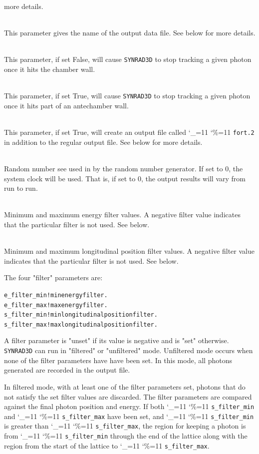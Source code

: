 \documentclass[11pt]{article}
\newcommand{\srthree}{\texttt{SYNRAD3D}\xspace}
\newcommand\ttcmd{\begingroup\catcode`\_=11 \catcode`\%=11 \dottcmd}
\newcommand\dottcmd[1]{\texttt{#1}\endgroup}
\newcommand{\vn}{\ttcmd}
\newcommand{\Newline}{\hfil \\}
\newlength{\ExBeg}
\newlength{\ExEnd}
\newenvironment{example}
  {\vspace{\ExBeg} \begin{alltt}}
  {\end{alltt} \vspace{\ExEnd}}
\begin{document}
\begin{description}
more details.
  \item[\vn{dat_file}] \Newline
This parameter gives the name of the output data file.
See below for more details.
  \item[\vn{sr3d_params\%allow_reflections}] \Newline
This parameter, if set False, will cause \srthree to stop tracking a given photon once
it hits the chamber wall.
  \item[\vn{sr3d_params\%stop_if_hit_antechamber}] \Newline
This parameter, if set True, will cause \srthree to stop tracking a given photon once
it hits part of an antechamber wall.
  \item[\vn{sr3d_params\%debug}] \Newline
This parameter, if set True, will create an output file called \vn{fort.2} in addition
to the regular output file.
See below for more details.
  \item[\vn{random_seed}] \Newline
Random number see used in by the random number generator. If set to 0, the system clock
will be used. That is, if set to 0, the output results will vary from run to run. 
  \item[\vn{e_filter_min}, \vn{e_filter_max}] \Newline
Minimum and maximum energy filter values. A negative filter value
indicates that the particular filter is not used. See below.
  \item[\vn{s_filter_min}, \vn{s_filter_max}] \Newline
Minimum and maximum longitudinal position filter values. A negative filter value
indicates that the particular filter is not used. See below.
\end{description}

The four "filter" parameters are:
\begin{example}
  e_filter_min   ! min energy filter.
  e_filter_max   ! max energy filter.
  s_filter_min   ! min longitudinal position filter.
  s_filter_max   ! max longitudinal position filter.
\end{example}
A filter parameter is "unset" if its value is negative and is "set"
otherwise.  \srthree can run in "filtered" or "unfiltered"
mode. Unfiltered mode occurs when none of the filter parameters have
have been set. In this mode, all photons generated are recorded in
the output file.

In filtered mode, with at least one of the filter parameters set,
photons that do not satisfy the set filter values are discarded. The
filter parameters are compared against the final photon position and
energy. If both \vn{s_filter_min} and \vn{s_filter_max} have been set,
and \vn{s_filter_min} is greater than \vn{s_filter_max}, the region
for keeping a photon is from \vn{s_filter_min} through the end of the
lattice along with the region from the start of the lattice to
\vn{s_filter_max}. 
\end{document}
